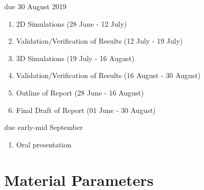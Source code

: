 \documentclass[12pt,twoside]{article}
\theoremstyle{break}
\begin{document}
\vspace{0.3cm}
{\color{red} due 30 August 2019} 

\begin{enumerate}[resume]
    \item 2D Simulations (28 June - 12 July)
    \item Validation/Verification of Results (12 July - 19 July)\\
    \item 3D Simulations (19 July - 16 August)
    \item Validation/Verification of Results (16 August - 30 August)\\
    \item Outline of Report (28 June - 16 August)
    \item Final Draft of Report (01 June - 30 August)
\end{enumerate}

\vspace{0.3cm}
{\color{red} due early-mid September}

\begin{enumerate}[resume]
    \item Oral presentation
\end{enumerate}

\newpage
%
\printbibliography
%
%
\appendix
\newpage
\section{Material Parameters}
\label{sec:MaterialParameters}
\end{document}
